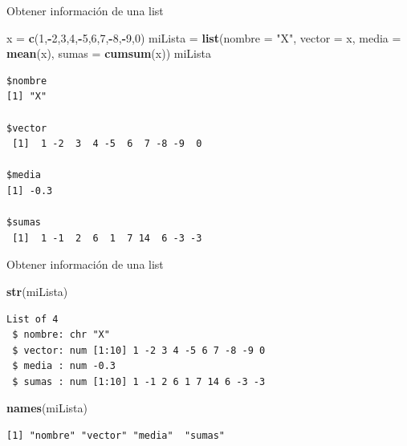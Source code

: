 \documentclass[
  ignorenonframetext,
  aspectratio=169]{beamer}
\newenvironment{Shaded}{\begin{snugshade}}{\end{snugshade}}
\newcommand{\AttributeTok}[1]{\textcolor[rgb]{0.13,0.29,0.53}{#1}}
\newcommand{\DecValTok}[1]{\textcolor[rgb]{0.00,0.00,0.81}{#1}}
\newcommand{\FunctionTok}[1]{\textcolor[rgb]{0.13,0.29,0.53}{\textbf{#1}}}
\newcommand{\NormalTok}[1]{#1}
\newcommand{\OtherTok}[1]{\textcolor[rgb]{0.56,0.35,0.01}{#1}}
\newcommand{\SpecialCharTok}[1]{\textcolor[rgb]{0.81,0.36,0.00}{\textbf{#1}}}
\newcommand{\StringTok}[1]{\textcolor[rgb]{0.31,0.60,0.02}{#1}}
\begin{document}
\begin{frame}[fragile]{Obtener información de una list}
\label{obtener-informaciuxf3n-de-una-list-1}
\begin{Shaded}
\begin{Highlighting}[]
\NormalTok{x }\OtherTok{=} \FunctionTok{c}\NormalTok{(}\DecValTok{1}\NormalTok{,}\SpecialCharTok{{-}}\DecValTok{2}\NormalTok{,}\DecValTok{3}\NormalTok{,}\DecValTok{4}\NormalTok{,}\SpecialCharTok{{-}}\DecValTok{5}\NormalTok{,}\DecValTok{6}\NormalTok{,}\DecValTok{7}\NormalTok{,}\SpecialCharTok{{-}}\DecValTok{8}\NormalTok{,}\SpecialCharTok{{-}}\DecValTok{9}\NormalTok{,}\DecValTok{0}\NormalTok{)}
\NormalTok{miLista }\OtherTok{=} \FunctionTok{list}\NormalTok{(}\AttributeTok{nombre =} \StringTok{"X"}\NormalTok{, }\AttributeTok{vector =}\NormalTok{ x, }\AttributeTok{media =} \FunctionTok{mean}\NormalTok{(x), }
               \AttributeTok{sumas =} \FunctionTok{cumsum}\NormalTok{(x))}
\NormalTok{miLista}
\end{Highlighting}
\end{Shaded}

\begin{verbatim}
$nombre
[1] "X"

$vector
 [1]  1 -2  3  4 -5  6  7 -8 -9  0

$media
[1] -0.3

$sumas
 [1]  1 -1  2  6  1  7 14  6 -3 -3
\end{verbatim}
\end{frame}

\begin{frame}[fragile]{Obtener información de una list}
\label{obtener-informaciuxf3n-de-una-list-2}
\begin{Shaded}
\begin{Highlighting}[]
\FunctionTok{str}\NormalTok{(miLista)}
\end{Highlighting}
\end{Shaded}

\begin{verbatim}
List of 4
 $ nombre: chr "X"
 $ vector: num [1:10] 1 -2 3 4 -5 6 7 -8 -9 0
 $ media : num -0.3
 $ sumas : num [1:10] 1 -1 2 6 1 7 14 6 -3 -3
\end{verbatim}

\begin{Shaded}
\begin{Highlighting}[]
\FunctionTok{names}\NormalTok{(miLista)}
\end{Highlighting}
\end{Shaded}

\begin{verbatim}
[1] "nombre" "vector" "media"  "sumas" 
\end{verbatim}
\end{frame}
\end{document}
